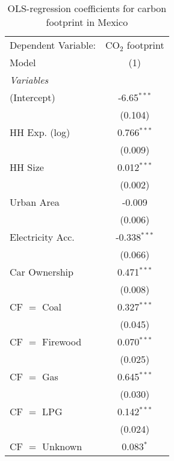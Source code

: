 
\begin{table}[htbp!]
   \centering
   \small
   \begin{adjustbox}{width = 1\textwidth, max height = 0.95\textheight, center}
      \begin{threeparttable}[b]
         \caption{\label{tab:OLS_2_MEX} OLS-regression coefficients for carbon footprint in Mexico}
         \begin{tabular}{lc}
            \tabularnewline \midrule \midrule
            Dependent Variable: & CO$_{2}$ footprint\\  
            Model               & (1)\\  
            \midrule
            \emph{Variables}\\
            (Intercept)         & -6.65$^{***}$\\   
                                & (0.104)\\   
            HH Exp. (log)       & 0.766$^{***}$\\   
                                & (0.009)\\   
            HH Size             & 0.012$^{***}$\\   
                                & (0.002)\\   
            Urban Area          & -0.009\\   
                                & (0.006)\\   
            Electricity Acc.    & -0.338$^{***}$\\   
                                & (0.066)\\   
            Car Ownership       & 0.471$^{***}$\\   
                                & (0.008)\\   
            CF $=$ Coal         & 0.327$^{***}$\\   
                                & (0.045)\\   
            CF $=$ Firewood     & 0.070$^{***}$\\   
                                & (0.025)\\   
            CF $=$ Gas          & 0.645$^{***}$\\   
                                & (0.030)\\   
            CF $=$ LPG          & 0.142$^{***}$\\   
                                & (0.024)\\   
            CF $=$ Unknown      & 0.083$^{*}$\\   

\end{tabular}
\end{threeparttable}
\end{adjustbox}
\end{table}
